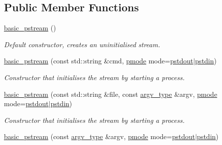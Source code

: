 \subsection*{Public Member Functions}
\begin{DoxyCompactItemize}
\item 
\mbox{\label{classredi_1_1basic__pstream_a254f8af27912096eed1b4ce67dc88066}} 
\mbox{\hyperlink{classredi_1_1basic__pstream_a254f8af27912096eed1b4ce67dc88066}{basic\+\_\+pstream}} ()
\begin{DoxyCompactList}\small\item\em Default constructor, creates an uninitialised stream. \end{DoxyCompactList}\item 
\mbox{\hyperlink{classredi_1_1basic__pstream_a0e0854f94230e9685cf4b02d3115008c}{basic\+\_\+pstream}} (const std\+::string \&cmd, \mbox{\hyperlink{structredi_1_1pstreams_a1eae4aad88812af03a0fbb3ec13c50b7}{pmode}} mode=\mbox{\hyperlink{structredi_1_1pstreams_ad3c6d53a98de4566478b1c40c101a42b}{pstdout}}$\vert$\mbox{\hyperlink{structredi_1_1pstreams_a7a976ce992db857f86a0cc3352e42d3a}{pstdin}})
\begin{DoxyCompactList}\small\item\em Constructor that initialises the stream by starting a process. \end{DoxyCompactList}\item 
\mbox{\hyperlink{classredi_1_1basic__pstream_a704808ffa353801653909d8de10a84ab}{basic\+\_\+pstream}} (const std\+::string \&file, const \mbox{\hyperlink{structredi_1_1pstreams_af902b894b095c1875e96c10129489467}{argv\+\_\+type}} \&argv, \mbox{\hyperlink{structredi_1_1pstreams_a1eae4aad88812af03a0fbb3ec13c50b7}{pmode}} mode=\mbox{\hyperlink{structredi_1_1pstreams_ad3c6d53a98de4566478b1c40c101a42b}{pstdout}}$\vert$\mbox{\hyperlink{structredi_1_1pstreams_a7a976ce992db857f86a0cc3352e42d3a}{pstdin}})
\begin{DoxyCompactList}\small\item\em Constructor that initialises the stream by starting a process. \end{DoxyCompactList}\item 
\mbox{\hyperlink{classredi_1_1basic__pstream_a4c94eb6302ef1281b4e57a765af1e3fd}{basic\+\_\+pstream}} (const \mbox{\hyperlink{structredi_1_1pstreams_af902b894b095c1875e96c10129489467}{argv\+\_\+type}} \&argv, \mbox{\hyperlink{structredi_1_1pstreams_a1eae4aad88812af03a0fbb3ec13c50b7}{pmode}} mode=\mbox{\hyperlink{structredi_1_1pstreams_ad3c6d53a98de4566478b1c40c101a42b}{pstdout}}$\vert$\mbox{\hyperlink{structredi_1_1pstreams_a7a976ce992db857f86a0cc3352e42d3a}{pstdin}})

\end{DoxyCompactItemize}
